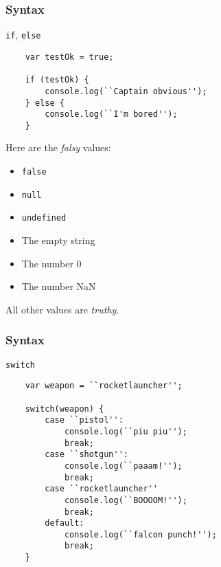 \begin{frame}[fragile]
  \frametitle{Syntax}

  \begin{block}{\texttt{if}, \texttt{else}}
    \scriptsize{
    \begin{verbatim}
    var testOk = true;

    if (testOk) {
        console.log(``Captain obvious'');
    } else {
        console.log(``I'm bored'');
    }
    \end{verbatim}
    }
    Here are the \textit{falsy} values:
    \begin{itemize}
      \item \texttt{false}
      \item \texttt{null}
      \item \texttt{undefined}
      \item The empty string
      \item The number 0
      \item The number NaN
    \end{itemize}
    All other values are \textit{truthy}.
  \end{block}
\end{frame}

\begin{frame}[fragile]
  \frametitle{Syntax}

  \begin{block}{\texttt{switch}}
    \scriptsize{
    \begin{verbatim}
    var weapon = ``rocketlauncher'';

    switch(weapon) {
        case ``pistol'':
            console.log(``piu piu'');
            break;
        case ``shotgun'':
            console.log(``paaam!'');
            break;
        case ``rocketlauncher''
            console.log(``BOOOOM!'');
            break;
        default:
            console.log(``falcon punch!'');
            break;
    }
    \end{verbatim}
    }
  \end{block}
\end{frame}

